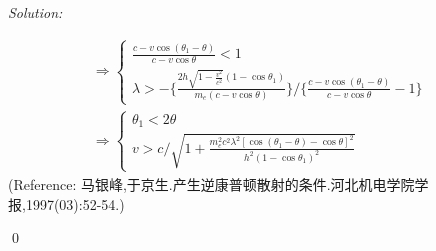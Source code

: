 \documentclass[12pt]{article}
\newenvironment{sol}
    {\emph{Solution:}
    }
    {
    \qed
    }
\begin{document}
\begin{sol}
\begin{gather}
\Longrightarrow\left\{\begin{array}{l}
\frac{c-v\cos(\theta_1-\theta)}{c-v\cos\theta}<1\\
\lambda>-\{\frac{2h\sqrt{1-\frac{v^2}{c^2}}(1-\cos\theta_1)}{m_e(c-v\cos\theta)}\}/\{\frac{c-v\cos(\theta_1-\theta)}{c-v\cos\theta}-1\}
\end{array}\right.\\
\Longrightarrow\left\{\begin{array}{l}
\theta_1<2\theta\\
v>c/\sqrt{1+\frac{m_e^2c^2\lambda^2[\cos(\theta_1-\theta)-\cos\theta]^2}{h^2(1-\cos\theta_1)^2}}
\end{array}\right.
\end{gather}
\footnotesize(Reference: 马银峰,于京生.产生逆康普顿散射的条件.河北机电学院学报,1997(03):52-54.)\normalsize
\end{sol}
\end{document}
